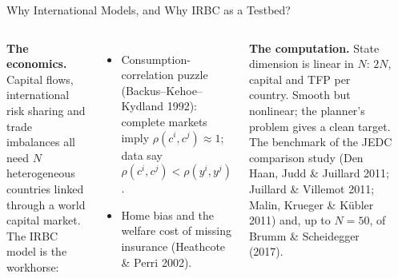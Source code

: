 \documentclass[aspectratio=169,11pt]{beamer}
\newcommand{\emphc}[1]{\textcolor{harvardcrimson}{#1}}
\begin{document}
\begin{frame}{Why International Models, and Why IRBC as a Testbed?}
\scriptsize
\begin{columns}[T]
\textbf{The economics.}  Capital flows, international risk sharing and trade imbalances all need
$N$ heterogeneous countries linked through a world capital market. The IRBC model is the workhorse:
\begin{itemize}\itemsep1pt
    \item \emphc{Consumption-correlation puzzle} (Backus--Kehoe--Kydland 1992): complete markets
          imply $\rho(c^i,c^j)\approx 1$; data say $\rho(c^i,c^j)<\rho(y^i,y^j)$.
    \item \emphc{Home bias} and the \emphc{welfare cost of missing insurance} (Heathcote \& Perri 2002).
\end{itemize}

\vspace{0.2em}
\textbf{The computation.}  State dimension is \emphc{linear in $N$}: $2N$, capital and TFP per country.
Smooth but nonlinear; the planner's problem gives a clean target. The benchmark of the JEDC comparison
study (Den Haan, Judd \& Juillard 2011; Juillard \& Villemot 2011; Malin, Krueger \& K\"ubler 2011) and,
up to $N = 50$, of Brumm \& Scheidegger (2017).

\begin{center}
\end{center}
\end{columns}
\end{frame}
\end{document}
